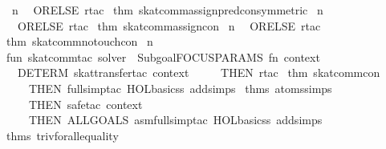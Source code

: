 \begin{isabellebody}
\endisaantiq
\ n\isanewline
\ \ ORELSE\ rtac\ %
\isaantiq
thm\ skat{}comm{}assign{}pred{}con{}symmetric{}{}%
\endisaantiq
\ n\isanewline
\ \ ORELSE\ rtac\ %
\isaantiq
thm\ skat{}comm{}assign{}con{}%
\endisaantiq
\ n\isanewline
\ \ ORELSE\ rtac\ %
\isaantiq
thm\ skat{}comm{}no{}touch{}con{}%
\endisaantiq
\ n\isanewline
\isanewline
fun\ skat{}comm{}tac\ solver\ {}\ Subgoal{}FOCUS{}PARAMS\ {}fn\ {}context{}\ {}{}{}{}\ {}{}\isanewline
\ \ DETERM\ {}skat{}transfer{}tac\ context\ {}\isanewline
\ \ \ \ THEN\ rtac\ %
\isaantiq
thm\ skat{}comm{}con{}%
\endisaantiq
\ {}\isanewline
\ \ \ \ THEN\ full{}simp{}tac\ {}HOL{}basic{}ss\ addsimps\ %
\isaantiq
thms\ atoms{}simps{}%
\endisaantiq
{}\ {}\isanewline
\ \ \ \ THEN\ safe{}tac\ context\isanewline
\ \ \ \ THEN\ ALLGOALS\ {}asm{}full{}simp{}tac\ {}HOL{}basic{}ss\ addsimps\ %
\isaantiq
thms\ triv{}forall{}equality{}%
\endisaantiq
{}{}\isanewline

\end{isabellebody}
